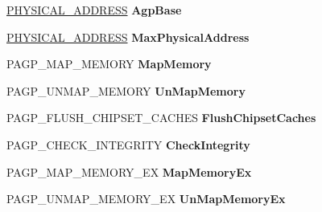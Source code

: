 \begin{DoxyCompactItemize}
\hyperlink{union___l_a_r_g_e___i_n_t_e_g_e_r}{P\+H\+Y\+S\+I\+C\+A\+L\+\_\+\+A\+D\+D\+R\+E\+SS} {\bfseries Agp\+Base}
\item 
\mbox{\label{struct___a_g_p___b_u_s___i_n_t_e_r_f_a_c_e___s_t_a_n_d_a_r_d_a4ebbbaa68e7d3e87453507510dfe663b}} 
\hyperlink{union___l_a_r_g_e___i_n_t_e_g_e_r}{P\+H\+Y\+S\+I\+C\+A\+L\+\_\+\+A\+D\+D\+R\+E\+SS} {\bfseries Max\+Physical\+Address}
\item 
\mbox{\label{struct___a_g_p___b_u_s___i_n_t_e_r_f_a_c_e___s_t_a_n_d_a_r_d_a7e916f25ca4ab2fe7e027b9ab2c7eee6}} 
P\+A\+G\+P\+\_\+\+M\+A\+P\+\_\+\+M\+E\+M\+O\+RY {\bfseries Map\+Memory}
\item 
\mbox{\label{struct___a_g_p___b_u_s___i_n_t_e_r_f_a_c_e___s_t_a_n_d_a_r_d_a3bda176e97c1ca7ef0023b03e8ed87d8}} 
P\+A\+G\+P\+\_\+\+U\+N\+M\+A\+P\+\_\+\+M\+E\+M\+O\+RY {\bfseries Un\+Map\+Memory}
\item 
\mbox{\label{struct___a_g_p___b_u_s___i_n_t_e_r_f_a_c_e___s_t_a_n_d_a_r_d_ac4ee3edd4ced015c30598592d1186911}} 
P\+A\+G\+P\+\_\+\+F\+L\+U\+S\+H\+\_\+\+C\+H\+I\+P\+S\+E\+T\+\_\+\+C\+A\+C\+H\+ES {\bfseries Flush\+Chipset\+Caches}
\item 
\mbox{\label{struct___a_g_p___b_u_s___i_n_t_e_r_f_a_c_e___s_t_a_n_d_a_r_d_a93378a8594a927349dbf265828e99728}} 
P\+A\+G\+P\+\_\+\+C\+H\+E\+C\+K\+\_\+\+I\+N\+T\+E\+G\+R\+I\+TY {\bfseries Check\+Integrity}
\item 
\mbox{\label{struct___a_g_p___b_u_s___i_n_t_e_r_f_a_c_e___s_t_a_n_d_a_r_d_a2b65cf687e9e14e8b45edef5cb9c6587}} 
P\+A\+G\+P\+\_\+\+M\+A\+P\+\_\+\+M\+E\+M\+O\+R\+Y\+\_\+\+EX {\bfseries Map\+Memory\+Ex}
\item 
\mbox{\label{struct___a_g_p___b_u_s___i_n_t_e_r_f_a_c_e___s_t_a_n_d_a_r_d_aedca01c5f8a07e7d46b353ac809e8421}} 
P\+A\+G\+P\+\_\+\+U\+N\+M\+A\+P\+\_\+\+M\+E\+M\+O\+R\+Y\+\_\+\+EX {\bfseries Un\+Map\+Memory\+Ex}

\end{DoxyCompactItemize}
